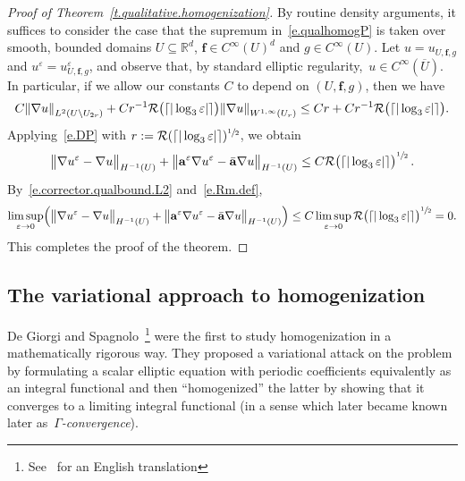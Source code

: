 \documentclass[11pt]{article} %
\numberwithin{equation}{section}
\theoremstyle{definition}
\let\originalleft\left
\let\originalright\right
\renewcommand{\left}{\mathopen{}\mathclose\bgroup\originalleft}
\renewcommand{\right}{\aftergroup\egroup\originalright}
\newcommand*{\Rd}{\ensuremath{\mathbb{R}^d}}
\newcommand{\eps}{\varepsilon}
\newcommand{\f}{\mathbf{f}}
\newcommand{\ep}{\eps}
\renewcommand{\a}{\mathbf{a}}
\newcommand{\ahom}{\bar{\a}}
\begin{document}
\begin{proof}[{Proof of Theorem~\ref{t.qualitative.homogenization}}]
By routine density arguments, it suffices to consider the case that the supremum in~\eqref{e.qualhomogP} is taken over smooth, bounded domains $U\subseteq\Rd$, $\f \in C^\infty(U)^d$ and $g\in C^\infty(U)$.
Let $u = u_{U,\f,g}$ and $u^\ep = u^\ep_{U,\f,g}$, and observe that, by standard elliptic regularity,~$u \in C^\infty(\overline{U})$. In particular, if we allow our constants $C$ to depend on $(U,\f,g)$, then we have 
\begin{align*}
C \left\| \nabla u \right\|_{L^{2}(U \setminus U_{2r})} 
+
Cr^{-1} \mathcal{R}\bigl( \lceil |\log_3 \ep| \rceil \bigr) \left\|  \nabla u \right\|_{W^{1,\infty}(U_r)}
\leq 
Cr + Cr^{-1}  \mathcal{R}\bigl( \lceil |\log_3 \ep| \rceil \bigr).
\end{align*}
Applying~\eqref{e.DP} with $r:= \mathcal{R}(\lceil |\log_3 \ep |\rceil)^{\sfrac12}$, we obtain 
\begin{align*}
\bigl\| \nabla u^\ep  -\nabla u  \bigr\|_{H^{-1}(U)}
+
\bigl\| \a^\ep \nabla u^\ep  - \ahom \nabla u  \bigr\|_{H^{-1}(U)}
\leq 
C \mathcal{R}\bigl( \lceil |\log_3 \ep| \rceil \bigr)^{\sfrac12}\,.
\end{align*}
By~\eqref{e.corrector.qualbound.L2} and~\eqref{e.Rm.def}, 
\begin{align*}
\limsup_{\ep\to 0} \Bigl( \bigl\| \nabla u^\ep  -\nabla u  \bigr\|_{H^{-1}(U)}
+
\bigl\| \a^\ep \nabla u^\ep  - \ahom \nabla u  \bigr\|_{H^{-1}(U)} \Bigr)
\leq
C \limsup_{\ep\to 0} \mathcal{R}\bigl( \lceil |\log_3 \ep| \rceil \bigr)^{\sfrac12} = 0. 
\end{align*}
This completes the proof of the theorem. 
\end{proof}




\subsection{The variational approach to  homogenization}
\label{ss.variational}


De Giorgi and Spagnolo~\cite{DGS}\footnote{See~\cite{DG} for an English translation} were the first to study homogenization in a mathematically rigorous way. They proposed a variational attack on the problem by formulating a scalar elliptic equation with periodic coefficients equivalently as an integral functional and then ``homogenized'' the latter by showing that it converges to a limiting integral functional (in a sense which later became known later as~\emph{$\Gamma$-convergence}). 
\end{document}
